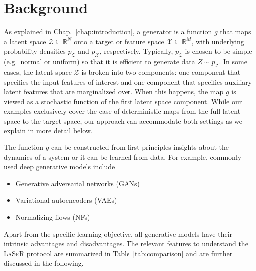 \section{Background}
\label{sec:background}
As explained in Chap.~\ref{chap:introduction}, a generator is a function $g$ that maps a latent space $\mathcal{Z}\subseteq \mathbb{R}^N$ onto a target or feature space $\mathcal{X}\subseteq \mathbb{R}^M$, with underlying probability densities $p_\mathcal{Z}$ and $p_\mathcal{X}$, respectively.  Typically, $p_\mathcal{Z}$ is chosen to be simple (e.g.\ normal or uniform) so that it is efficient to generate data $Z\sim p_\mathcal{Z}$.  In some cases, the latent space $\mathcal{Z}$ is broken into two components: one component that specifies the input features of interest and one component that specifies auxiliary latent features that are marginalized over.  When this happens, the map $g$ is viewed as a stochastic function of the first latent space component.  While our examples exclusively cover the case of deterministic maps from the full latent space to the target space, our approach can accommodate both settings as we explain in more detail below.

The function $g$ can be constructed from first-principles insights about the dynamics of a system or it can be learned from data.  For example, commonly-used deep generative models include

\begin{itemize}
    \item Generative adversarial networks (GANs)~\cite{goodfellow,Creswell2018}
    \item Variational autoencoders (VAEs)~\cite{kingma2014autoencoding,Kingma2019}
    \item Normalizing flows (NFs)~\cite{nflow1,nflow_review} 
\end{itemize}

Apart from the specific learning objective, all generative models have their intrinsic advantages and disadvantages. The relevant features to understand the \textsc{LaSeR} protocol are summarized in Table~\ref{tab:comparison} and are further discussed in the following.

